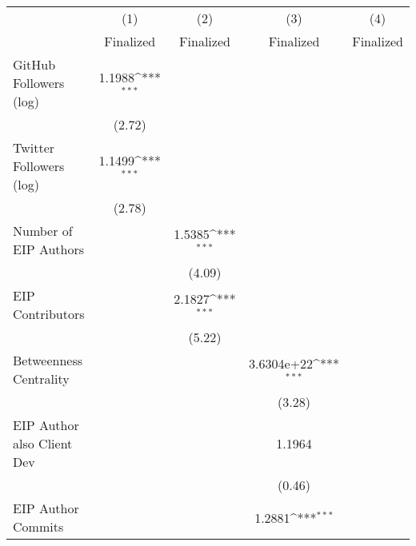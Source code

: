 {
\def\sym#1{\ifmmode^{#1}\else\(^{#1}\)\fi}
\begin{tabular}{l*{4}{c}}
\hline\hline
                                   &\multicolumn{1}{c}{(1)}         &\multicolumn{1}{c}{(2)}         &\multicolumn{1}{c}{(3)}         &\multicolumn{1}{c}{(4)}         \\
                                   &   Finalized         &   Finalized         &   Finalized         &   Finalized         \\
\hline
GitHub Followers (log)             &      1.1988\sym{***}&                     &                     &                     \\
                                   &      (2.72)         &                     &                     &                     \\
[1em]
Twitter Followers (log)            &      1.1499\sym{***}&                     &                     &                     \\
                                   &      (2.78)         &                     &                     &                     \\
[1em]
Number of EIP Authors              &                     &      1.5385\sym{***}&                     &                     \\
                                   &                     &      (4.09)         &                     &                     \\
[1em]
EIP Contributors                   &                     &      2.1827\sym{***}&                     &                     \\
                                   &                     &      (5.22)         &                     &                     \\
[1em]
Betweenness Centrality             &                     &                     &  3.6304e+22\sym{***}&                     \\
                                   &                     &                     &      (3.28)         &                     \\
[1em]
EIP Author also Client Dev         &                     &                     &      1.1964         &                     \\
                                   &                     &                     &      (0.46)         &                     \\
[1em]
EIP Author Commits                 &                     &                     &      1.2881\sym{***}&                     \\

\end{tabular}}
